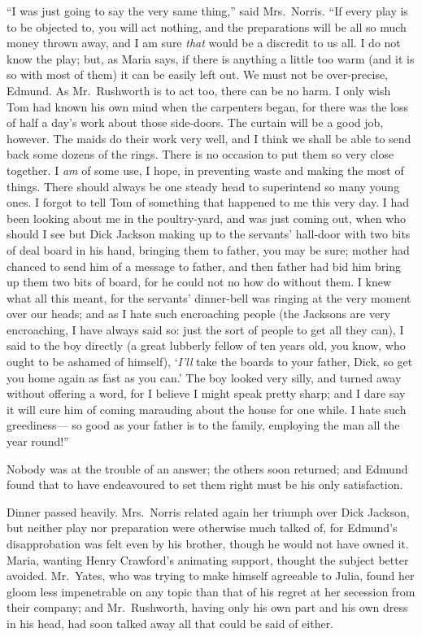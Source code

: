 \documentclass{article}
\begin{document}
``I was just going to say the very same thing,'' said Mrs.\ Norris.
``If every play is to be objected to, you will act nothing,
and the preparations will be all so much money thrown away,
and I am sure \emph{that} would be a discredit to us all.
I do not know the play; but, as Maria says, if there
is anything a little too warm (and it is so with most
of them) it can be easily left out.  We must not be
over-precise, Edmund.  As Mr.\ Rushworth is to act too,
there can be no harm.  I only wish Tom had known his own
mind when the carpenters began, for there was the loss
of half a day's work about those side-doors. The curtain
will be a good job, however.  The maids do their work
very well, and I think we shall be able to send back
some dozens of the rings.  There is no occasion to put
them so very close together.  I \emph{am} of some use, I hope,
in preventing waste and making the most of things.
There should always be one steady head to superintend
so many young ones.  I forgot to tell Tom of something
that happened to me this very day.  I had been looking
about me in the poultry-yard, and was just coming out,
when who should I see but Dick Jackson making up
to the servants' hall-door with two bits of deal board
in his hand, bringing them to father, you may be sure;
mother had chanced to send him of a message to father,
and then father had bid him bring up them two bits of board,
for he could not no how do without them.  I knew what all
this meant, for the servants' dinner-bell was ringing
at the very moment over our heads; and as I hate such
encroaching people (the Jacksons are very encroaching,
I have always said so:  just the sort of people to get
all they can), I said to the boy directly (a great lubberly
fellow of ten years old, you know, who ought to be ashamed
of himself), `\emph{I'll} take the boards to your father,
Dick, so get you home again as fast as you can.'
The boy looked very silly, and turned away without
offering a word, for I believe I might speak pretty sharp;
and I dare say it will cure him of coming marauding
about the house for one while.  I hate such greediness---%
so good as your father is to the family, employing the man
all the year round!''

Nobody was at the trouble of an answer; the others
soon returned; and Edmund found that to have endeavoured
to set them right must be his only satisfaction.

Dinner passed heavily.  Mrs.\ Norris related again
her triumph over Dick Jackson, but neither play nor
preparation were otherwise much talked of, for Edmund's
disapprobation was felt even by his brother, though he
would not have owned it.  Maria, wanting Henry Crawford's
animating support, thought the subject better avoided.
Mr.\ Yates, who was trying to make himself agreeable to Julia,
found her gloom less impenetrable on any topic than
that of his regret at her secession from their company;
and Mr.\ Rushworth, having only his own part and his own
dress in his head, had soon talked away all that could
be said of either.
\end{document}
